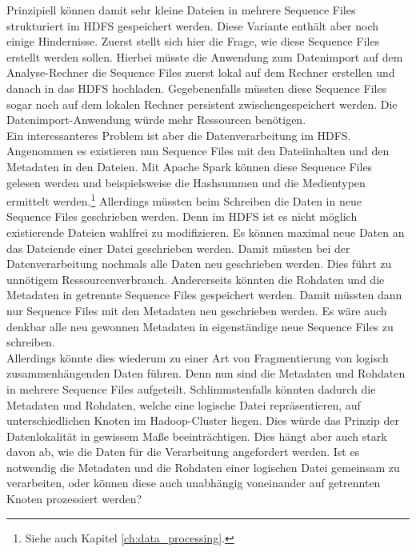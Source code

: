 \noindent
Prinzipiell können damit sehr kleine Dateien in mehrere Sequence Files strukturiert im HDFS gespeichert werden. Diese Variante enthält aber noch einige Hindernisse. Zuerst stellt sich hier die Frage, wie diese Sequence Files erstellt werden sollen. Hierbei müsste die Anwendung zum Datenimport auf dem Analyse-Rechner die Sequence Files zuerst lokal auf dem Rechner erstellen und danach in das HDFS hochladen. Gegebenenfalls müssten diese Sequence Files sogar noch auf dem lokalen Rechner persistent zwischengespeichert werden. Die Datenimport-Anwendung würde mehr Ressourcen benötigen.\\
Ein interessanteres Problem ist aber die Datenverarbeitung im HDFS. Angenommen es existieren nun Sequence Files mit den Dateiinhalten und den Metadaten in den Dateien. 
Mit Apache Spark können diese Sequence Files gelesen werden und beispielsweise die Hashsummen und die Medientypen ermittelt werden.\footnote{Siehe auch Kapitel \ref{ch:data_processing}.} Allerdings müssten beim Schreiben die Daten in neue Sequence Files geschrieben werden. Denn im HDFS ist es nicht möglich existierende Dateien wahlfrei zu modifizieren.\cite[S. 42]{expert_hadoop_admin} Es können maximal neue Daten an das Dateiende einer Datei geschrieben werden. 
Damit müssten bei der Datenverarbeitung nochmals alle Daten neu geschrieben werden. Dies führt zu unnötigem Ressourcenverbrauch. Andererseits könnten die Rohdaten und die Metadaten in getrennte Sequence Files gespeichert werden. Damit müssten dann nur Sequence Files mit den Metadaten neu geschrieben werden. Es wäre auch denkbar alle neu gewonnen Metadaten in eigenständige neue Sequence Files zu schreiben.\\ 
Allerdings könnte dies wiederum zu einer Art von Fragmentierung von logisch zusammenhängenden Daten führen. Denn nun sind die Metadaten und Rohdaten in mehrere Sequence Files aufgeteilt. Schlimmstenfalls könnten dadurch die Metadaten und Rohdaten, welche eine logische Datei repräsentieren, auf unterschiedlichen Knoten im Hadoop-Cluster liegen. 
Dies würde das Prinzip der Datenlokalität in gewissem Maße beeinträchtigen. Dies hängt aber auch stark davon ab, wie die Daten für die Verarbeitung angefordert werden. Ist es notwendig die Metadaten und die Rohdaten einer logischen Datei gemeinsam zu verarbeiten, oder können diese auch unabhängig voneinander auf getrennten Knoten prozessiert werden?\\

